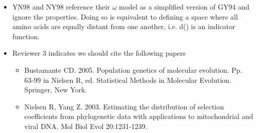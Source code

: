 \begin{itemize}
    \item YN98 and NY98 reference their $\omega$ model as a simplified version of GY94 and ignore the \PC properties.
    Doing so is equivalent to defining a \PC space where all amino acids are equally distant from one another, i.e. d() is an indicator function.
    \item Reviewer 3 indicates we should cite the following papers
\begin{itemize}
    \item Bustamante CD. 2005. Population genetics of molecular evolution. Pp. 63-99 in Nielsen R, ed. Statistical Methods in Molecular Evolution. Springer, New York.
    \item   Nielsen R, Yang Z. 2003. Estimating the distribution of selection coefficients from phylogenetic data with applications to mitochondrial and viral DNA. Mol Biol Evol 20:1231-1239.
\end{itemize}


\end{itemize}
